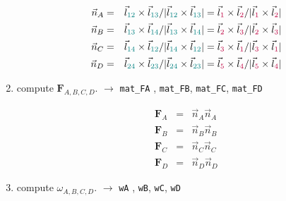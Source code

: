 \begin{enumerate}
\begin{eqnarray}
\vec{n}_A 
&=& \vec{l}_{\color{teal}12}\times\vec{l}_{\color{teal}13}/|\vec{l}_{\color{teal}12}\times\vec{l}_{\color{teal}13}|
= \vec{l}_{\color{purple}1}\times\vec{l}_{\color{purple}2}/| \vec{l}_{\color{purple}1}\times\vec{l}_{\color{purple}2}| \\
\vec{n}_B 
&=& \vec{l}_{\color{teal}13}\times\vec{l}_{\color{teal}14}/|\vec{l}_{\color{teal}13}\times\vec{l}_{\color{teal}14}|
= \vec{l}_{\color{purple}2}\times\vec{l}_{\color{purple}3}/|\vec{l}_{\color{purple}2}\times\vec{l}_{\color{purple}3}|  \\
\vec{n}_C 
&=& \vec{l}_{\color{teal}14}\times\vec{l}_{\color{teal}12}/|\vec{l}_{\color{teal}14}\times\vec{l}_{\color{teal}12}|   
= \vec{l}_{\color{purple}3}\times\vec{l}_{\color{purple}1}/|\vec{l}_{\color{purple}3}\times\vec{l}_{\color{purple}1}|   \\
\vec{n}_D 
&=& \vec{l}_{\color{teal}24}\times\vec{l}_{\color{teal}23}/|\vec{l}_{\color{teal}24}\times\vec{l}_{\color{teal}23}|   
= \vec{l}_{\color{purple}5}\times\vec{l}_{\color{purple}4}/|\vec{l}_{\color{purple}5}\times\vec{l}_{\color{purple}4}|
\end{eqnarray}


\item compute ${\bm F}_{A,B,C,D}$. 
$\rightarrow$ \verb|mat_FA| , \verb|mat_FB|, \verb|mat_FC|, 
\verb|mat_FD|

\begin{eqnarray}
{\bm F}_A &=& \vec{n}_A\vec{n}_A \\
{\bm F}_B &=& \vec{n}_B\vec{n}_B \\
{\bm F}_C &=& \vec{n}_C\vec{n}_C \\
{\bm F}_D &=& \vec{n}_D\vec{n}_D 
\end{eqnarray}

\item compute $\omega_{A,B,C,D}$. $\rightarrow$ \verb|wA| , \verb|wB|, \verb|wC|, \verb|wD|


\end{enumerate}

